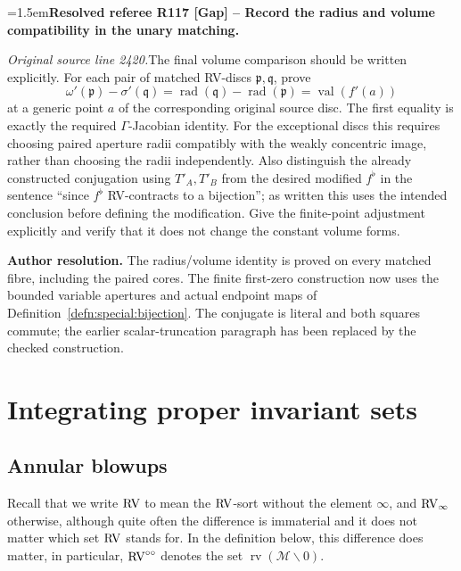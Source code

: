 \documentclass[12pt]{amsart}
\newcommand{\ResolvedRefereeRemark}[5]{%
  \par\medskip\begingroup\normalfont\small\color{gray}%
  \emergencystretch=1.5em\noindent\textbf{Resolved referee R#1 [#2] -- #3.}\par\nobreak\noindent #4\par
  \medskip\color{ResolutionGreen}\noindent\textbf{Author resolution.} #5\par
  \endgroup\medskip
}
\theoremstyle{plain}
\theoremstyle{definition}
\theoremstyle{remark}
\numberwithin{equation}{section}
\theoremstyle{plain}
\newcommand{\RV}{\textup{RV}}
\newcommand{\MM}{\mdl M}
\newcommand{\gp}{\mathfrak{p}}
\newcommand{\gq}{\mathfrak{q}}
\newcommand{\0}{\emptyset}
\newcommand{\mdl}[1]{\mathcal{#1}}  %
\newcommand{\mi}{\smallsetminus}
\DeclareMathOperator{\rv}{rv}
\DeclareMathOperator{\vv}{val}
\DeclareMathOperator{\rad}{rad}
\newcommand{\ccirc}{\circ \circ}
\begin{document}
\ResolvedRefereeRemark{117}{Gap}{Record the radius and volume compatibility in the unary matching}{%
\textit{Original source line 2420.}\quad The final volume comparison should be written explicitly. For each pair of matched RV-discs $\gp,\gq$, prove
\[
\omega'(\gp)-\sigma'(\gq)
 =\rad(\gq)-\rad(\gp)
 =\vv(f'(a))
\]
at a generic point $a$ of the corresponding original source disc. The first equality is exactly the required $\Gamma$-Jacobian identity. For the exceptional discs this requires choosing paired aperture radii compatibly with the weakly concentric image, rather than choosing the radii independently. Also distinguish the already constructed conjugation using $T'_A,T'_B$ from the desired modified $f^\flat$ in the sentence ``since $f^\flat$ RV-contracts to a bijection''; as written this uses the intended conclusion before defining the modification. Give the finite-point adjustment explicitly and verify that it does not change the constant volume forms.
}{The radius/volume identity is proved on every matched fibre, including the paired cores. The finite first-zero construction now uses the bounded variable apertures and actual endpoint maps of Definition~\ref{defn:special:bijection}. The conjugate is literal and both squares commute; the earlier scalar-truncation paragraph has been replaced by the checked construction.}

\section{Integrating proper invariant sets}
\label{section:int}

\subsection{Annular blowups}
Recall that we write $\RV$ to mean the $\RV$-sort without the  element $\infty$, and $\RV_\infty$ otherwise, although quite often the difference is immaterial and it does not matter which set $\RV$ stands for. In the definition below, this difference does matter, in particular, $\RV^{\ccirc}$ denotes the set $\rv(\MM \mi 0)$.
\end{document}
